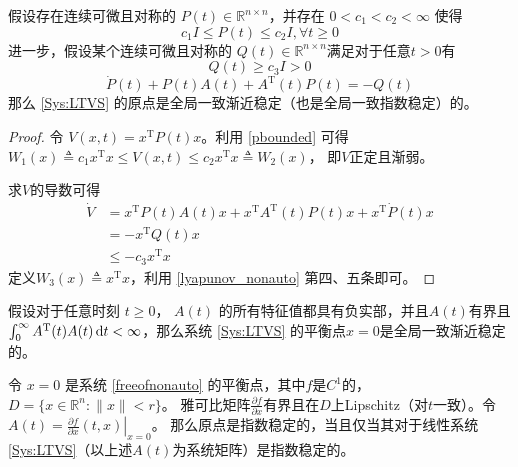 \begin{corollary}
  假设存在连续可微且对称的 $P (t) \in \mathbb{R}^{n \times n}$，并存在 $0 < c_1 < c_2 < \infty$
  使得
  \begin{equation}\label{pbounded}
    c_1 I \leq P (t) \leq c_2 I, \forall t \geq 0
  \end{equation}
  进一步，假设某个连续可微且对称的 $Q (t) \in \mathbb{R}^{n \times n}$满足对于任意$t>0$有
  \[ Q (t) \geq c_3 I > 0 \]
  \[ \dot{P} (t) + P (t) A (t) + A^\mathrm{T} (t) P (t) = - Q (t) \]
  那么 \eqref{Sys:LTVS} 的原点是全局一致渐近稳定（也是全局一致指数稳定）的。
\end{corollary}
\begin{proof}
    令 $V (x, t) = x^\mathrm{T} P (t) x$。利用 \eqref{pbounded} 可得
  $W_1 (x) \triangleq c_1 x^\mathrm{T} x \leq V (x, t) \leq c_2 x^\mathrm{T} x \triangleq W_2 (x)$，
  即$V$正定且渐弱。
  
  求$V$的导数可得
  \begin{align*}
    \dot{V} & =  x^\mathrm{T} P (t) A (t) x + x^\mathrm{T} A^\mathrm{T} (t) P (t) x + x^\mathrm{T} \dot{P} (t) x\\
    & =  - x^\mathrm{T} Q (t) x\\
    & \leq  - c_3 x^\mathrm{T} x
  \end{align*}
  定义$W_3 (x)\triangleq x^\mathrm{T} x $，利用 \ref{lyapunov_nonauto} 第四、五条即可。
\end{proof}

\begin{corollary}
  假设对于任意时刻 $t \geq 0$， $A (t)$ 的所有特征值都具有负实部，并且$A (t)$有界且 $\int^{\infty}_0
  A^\mathrm{T} (t) A (t) \mathop{}\!\mathrm{d}  t < \infty$，那么系统 \eqref{Sys:LTVS} 的平衡点$x=0$是全局一致渐近稳定的。
\end{corollary}
\begin{theorem}[利用线性化判别非自治系统的稳定性]
    令 $x = 0$ 是系统 \eqref{freeofnonauto} 的平衡点，其中$f$是$C^1$的，$D=\{x\in \mathbb{R}^n:\|x\|<r\}$。
    雅可比矩阵$\frac{\partial f}{\partial x}$有界且在$D$上Lipschitz（对$t$一致）。令$A(t)=\left.\frac{\partial f}{\partial x}(t,x)\right|_{x=0}$。
    那么原点是指数稳定的，当且仅当其对于线性系统 \eqref{Sys:LTVS}（以上述$A(t)$为系统矩阵）是指数稳定的。
\end{theorem}
